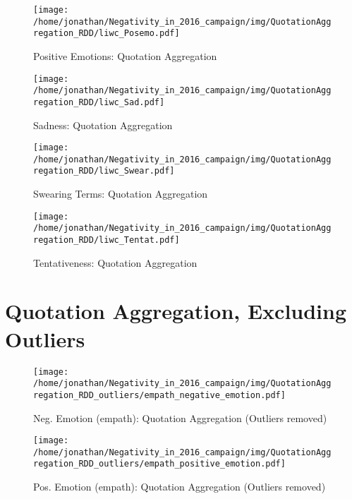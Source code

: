 \begin{figure}[h]\centering
\texttt{[image: /home/jonathan/Negativity\_in\_2016\_campaign/img/QuotationAggregation\_RDD/liwc\_Posemo.pdf]}
\caption{Positive Emotions: Quotation Aggregation}
\label{fig: qa_Positive Emotions}
\end
{figure}

\begin{figure}[h]\centering
\texttt{[image: /home/jonathan/Negativity\_in\_2016\_campaign/img/QuotationAggregation\_RDD/liwc\_Sad.pdf]}
\caption{Sadness: Quotation Aggregation}
\label{fig: qa_Sadness}
\end
{figure}

\begin{figure}[h]\centering
\texttt{[image: /home/jonathan/Negativity\_in\_2016\_campaign/img/QuotationAggregation\_RDD/liwc\_Swear.pdf]}
\caption{Swearing Terms: Quotation Aggregation}
\label{fig: qa_Swearing Terms}
\end
{figure}

\begin{figure}[h]\centering
\texttt{[image: /home/jonathan/Negativity\_in\_2016\_campaign/img/QuotationAggregation\_RDD/liwc\_Tentat.pdf]}
\caption{Tentativeness: Quotation Aggregation}
\label{fig: qa_Tentativeness}
\end
{figure}

\clearpage
\pagebreak

\section{Quotation Aggregation, Excluding Outliers}

\begin{figure}[h]\centering
\texttt{[image: /home/jonathan/Negativity\_in\_2016\_campaign/img/QuotationAggregation\_RDD\_outliers/empath\_negative\_emotion.pdf]}
\caption{Neg. Emotion (empath): Quotation Aggregation (Outliers removed)}
\label{fig: qa_Neg. Emotion (empath)}
\end
{figure}

\begin{figure}[h]\centering
\texttt{[image: /home/jonathan/Negativity\_in\_2016\_campaign/img/QuotationAggregation\_RDD\_outliers/empath\_positive\_emotion.pdf]}
\caption{Pos. Emotion (empath): Quotation Aggregation (Outliers removed)}
\label{fig: qa_Pos. Emotion (empath)}
\end
{figure}

